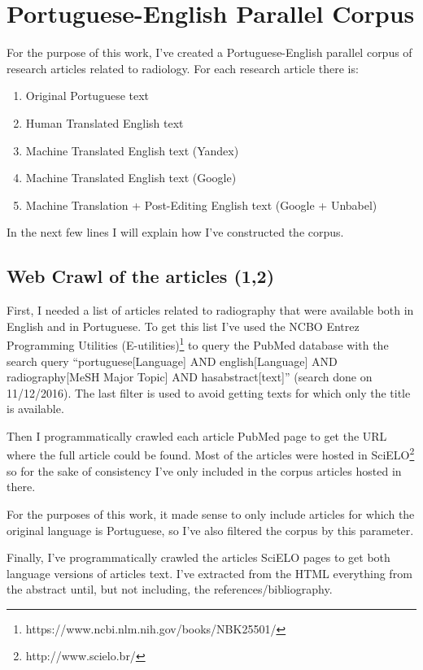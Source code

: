 \label{chap3}

\section{Portuguese-English Parallel Corpus}

For the purpose of this work, I've created a Portuguese-English parallel corpus of research articles related to radiology. For each research article there is:

\begin{enumerate}
\item Original Portuguese text
\item Human Translated English text
\item Machine Translated English text (Yandex) 
\item Machine Translated English text (Google) 
\item Machine Translation + Post-Editing English text (Google + Unbabel) 
\end{enumerate}

\noindent In the next few lines I will explain how I've constructed the corpus. 

\subsection{Web Crawl of the articles (1,2)}

First, I needed a list of articles related to radiography that were available both in English and in Portuguese. To get this list I’ve used the  NCBO Entrez Programming Utilities (E-utilities)\footnote{https://www.ncbi.nlm.nih.gov/books/NBK25501/} to query the PubMed database with the search query “portuguese[Language] AND english[Language] AND radiography[MeSH Major Topic] AND hasabstract[text]” (search done on 11/12/2016). The last filter is used to avoid getting texts for which only the title is available. 

Then I programmatically crawled each article PubMed page to get the URL where the full article could be found. Most of the articles were hosted in SciELO\footnote{http://www.scielo.br/} so for the sake of consistency I've only included in the corpus articles hosted in there. 

For the purposes of this work, it made sense to only include articles for which the original language is Portuguese, so I've also filtered the corpus by this parameter. 

Finally, I've programmatically crawled the articles SciELO pages to get both language versions of articles text. I've extracted from the HTML everything from the abstract until, but not including, the references/bibliography.


